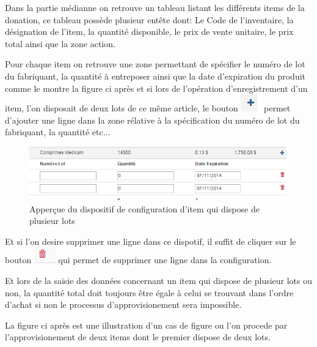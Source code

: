 \documentclass[12pt,a4paper]{report}
\begin{document}
Dans la partie médianne on retrouve un tableau listant les différents items de la donation, ce tableau possède plusieur entête dont: Le Code de l'inventaire, la désignation de l'item,  la quantité disponible, le prix de vente unitaire, le prix total ainsi que la zone action.

Pour chaque item on retrouve une zone permettant de spécifier le numéro de lot du fabriquant, la quantité à entreposer ainsi que la date d'expiration du produit comme le montre la figure ci après et si lors de l'opération d'enregistrement d'un item, l'on disposait de deux lots de ce même article, le bouton \includegraphics[scale=0.7]{pic/PlusGray.png} permet d'ajouter une ligne dans la zone rélative à la spécification du numéro de lot du fabriquant, la quantité etc...

\begin{figure}[h]
\begin{center}
\includegraphics[width=12cm]{pic/ForAddPlus.png}
\end{center}
\caption{Apperçue du dispositif de configuration d'item qui dispose de plusieur lots}
\label{Apperçue du dispositif de configuration d'item qui dispose de plusieur lots}
\end{figure}

Et si l'on desire supprimer une ligne dans ce dispotif, il suffit de cliquer sur le bouton \includegraphics[scale=0.7]{pic/DeleteWRed.png} qui permet de supprimer une ligne dans la configuration.

Et lors de la saisie des données concernant un item qui dispose de plusieur lots ou non, la quantité total doit toujours être égale à celui se trouvant dans l'ordre d'achat si non le processus d'approvisionement sera impossible.

La figure ci après est une illustration d'un cas de figure ou l'on procede par l'approvisionement de deux items dont le premier dispose de deux lots.
\end{document}
